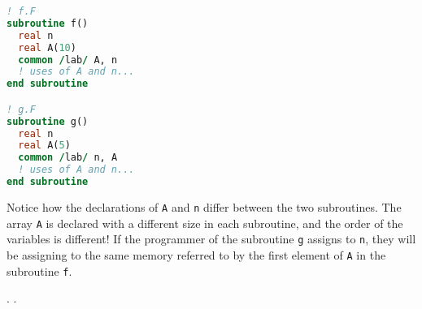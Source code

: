 \begin{lstlisting}[language=fortran,frame=single]
! f.F
subroutine f()
  real n
  real A(10)
  common /lab/ A, n
  ! uses of A and n...
end subroutine

! g.F
subroutine g()
  real n
  real A(5)
  common /lab/ n, A
  ! uses of A and n...
end subroutine
\end{lstlisting}

Notice how the declarations of \texttt{A} and \texttt{n} differ between the two
subroutines. The array \texttt{A} is declared with a different size in each subroutine,
and the order of the variables is different!
If the programmer of the subroutine \texttt{g} assigns to \texttt{n}, they
will be assigning to the same memory referred to by the first element of \texttt{A}
in the subroutine \texttt{f}.

.
\cite{backus_heising_fortran_1964}.
